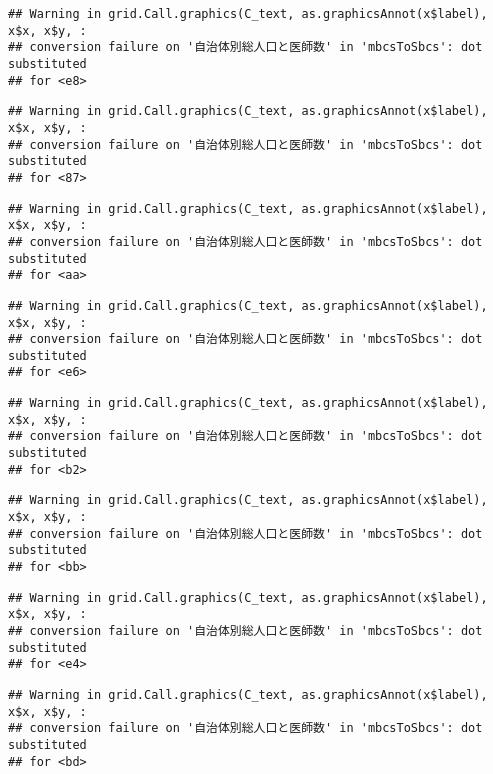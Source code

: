 \documentclass[
]{article}
\begin{document}
\begin{verbatim}
## Warning in grid.Call.graphics(C_text, as.graphicsAnnot(x$label), x$x, x$y, :
## conversion failure on '自治体別総人口と医師数' in 'mbcsToSbcs': dot substituted
## for <e8>
\end{verbatim}

\begin{verbatim}
## Warning in grid.Call.graphics(C_text, as.graphicsAnnot(x$label), x$x, x$y, :
## conversion failure on '自治体別総人口と医師数' in 'mbcsToSbcs': dot substituted
## for <87>
\end{verbatim}

\begin{verbatim}
## Warning in grid.Call.graphics(C_text, as.graphicsAnnot(x$label), x$x, x$y, :
## conversion failure on '自治体別総人口と医師数' in 'mbcsToSbcs': dot substituted
## for <aa>
\end{verbatim}

\begin{verbatim}
## Warning in grid.Call.graphics(C_text, as.graphicsAnnot(x$label), x$x, x$y, :
## conversion failure on '自治体別総人口と医師数' in 'mbcsToSbcs': dot substituted
## for <e6>
\end{verbatim}

\begin{verbatim}
## Warning in grid.Call.graphics(C_text, as.graphicsAnnot(x$label), x$x, x$y, :
## conversion failure on '自治体別総人口と医師数' in 'mbcsToSbcs': dot substituted
## for <b2>
\end{verbatim}

\begin{verbatim}
## Warning in grid.Call.graphics(C_text, as.graphicsAnnot(x$label), x$x, x$y, :
## conversion failure on '自治体別総人口と医師数' in 'mbcsToSbcs': dot substituted
## for <bb>
\end{verbatim}

\begin{verbatim}
## Warning in grid.Call.graphics(C_text, as.graphicsAnnot(x$label), x$x, x$y, :
## conversion failure on '自治体別総人口と医師数' in 'mbcsToSbcs': dot substituted
## for <e4>
\end{verbatim}

\begin{verbatim}
## Warning in grid.Call.graphics(C_text, as.graphicsAnnot(x$label), x$x, x$y, :
## conversion failure on '自治体別総人口と医師数' in 'mbcsToSbcs': dot substituted
## for <bd>
\end{verbatim}
\end{document}
